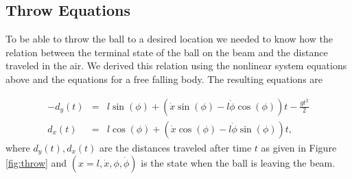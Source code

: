 



\subsection{Throw Equations}

To be able to throw the ball to a desired location we needed to know how the relation between the terminal state of the ball on the beam and the distance traveled in the air.
We derived this relation using the nonlinear system equations above and the equations for a free falling body.
The resulting equations are












\begin{eqnarray*}
-d_{y}(t) & = & l\sin(\phi)+\left(\dot{x}\sin(\phi)-l\dot{\phi}\cos(\phi)\right)t-\frac{gt^{2}}{2}\\
d_{x}(t) & = & l\cos(\phi)+\left(\dot{x}\cos(\phi)-l\dot{\phi}\sin(\phi)\right)t,
\end{eqnarray*}
where $d_{y}(t), d_{x}(t)$ are the distances traveled after time $t$ as given in Figure \ref{fig:throw} and $(x=l,\dot x,\phi, \dot{\phi})$ is the state when the ball is leaving the beam.

